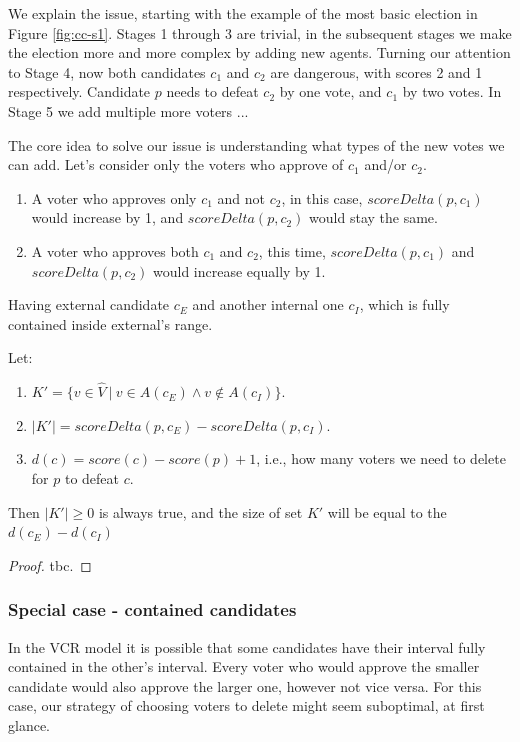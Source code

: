 We explain the issue, starting with the example of the most basic election in Figure \ref{fig:cc-s1}.
Stages 1 through 3 are trivial, in the subsequent stages we make the election more and more complex by adding new agents.
Turning our attention to Stage 4, now both candidates $c_1$ and $c_2$ are dangerous, with scores 2 and 1 respectively.
Candidate $p$ needs to defeat $c_2$ by one vote, and $c_1$ by two votes. 
In Stage 5 we add multiple more voters ... 

The core idea to solve our issue is understanding what types of the new votes we can add.
Let's consider only the voters who approve of $c_1$ and/or $c_2$.
\begin{enumerate}
    \item A voter who approves only $c_1$ and not $c_2$,
    in this case, $scoreDelta(p,c_1)$ would increase by 1, and $scoreDelta(p,c_2)$ would stay the same.
    \item A voter who approves both $c_1$ and $c_2$, this time,
    $scoreDelta(p,c_1)$ and $scoreDelta(p,c_2)$ would increase equally by 1.
\end{enumerate}

\begin{proposition}
    Having external candidate $c_E$ and another internal one $c_I$, which is fully contained inside external's range.
    
    Let:
    \begin{enumerate}
        \item $K' = \{v \in \widehat{V} \: | \: v \in A(c_E) \land v \notin A(c_I)\}$.
        \item $|K'| = scoreDelta(p,c_E) - scoreDelta(p,c_I)$.
        \item $d(c) = score(c) - score(p) + 1$, i.e., how many voters we need to delete for $p$ to defeat $c$.
    \end{enumerate}     
    Then $|K'| \geq 0$ is always true, and the size of set $K'$ will be equal to the $d(c_E) - d(c_I)$

    \begin{proof}
        tbc. 
    \end{proof}
\end{proposition}

\subsubsection{Special case - contained candidates} \label{sss:contained-candidate}
In the VCR model it is possible that some candidates have their interval fully contained in the other's interval. 
Every voter who would approve the smaller candidate would also approve the larger one, however not vice versa.
For this case, our strategy of choosing voters to delete might seem suboptimal, at first glance. 

